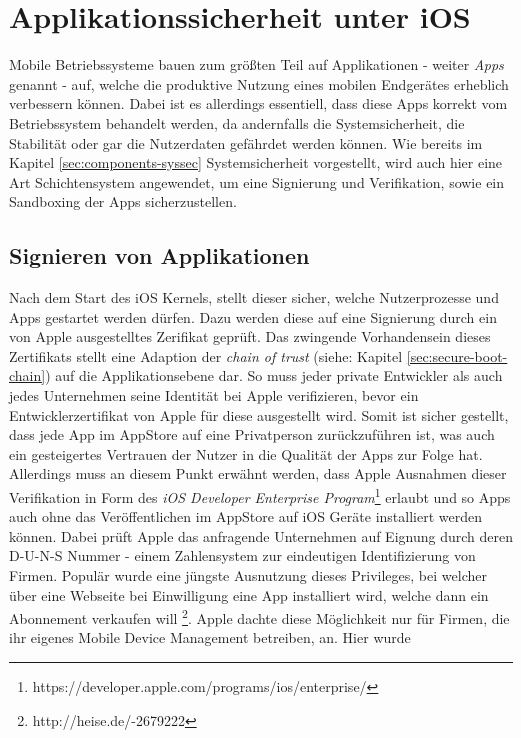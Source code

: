 \section{Applikationssicherheit unter iOS}
	Mobile Betriebssysteme bauen zum größten Teil auf Applikationen - weiter
	\textsl{Apps} genannt - auf, welche die produktive Nutzung eines mobilen
	Endgerätes erheblich verbessern können. Dabei ist es allerdings
	essentiell, dass diese Apps korrekt vom Betriebssystem behandelt werden, da
	andernfalls die Systemsicherheit, die Stabilität oder gar die Nutzerdaten
	gefährdet werden können. Wie bereits im Kapitel \ref{sec:components-syssec}
	Systemsicherheit vorgestellt, wird auch hier eine Art
	Schichtensystem angewendet, um eine Signierung und Verifikation, sowie ein
	Sandboxing der Apps sicherzustellen.
	
	\subsection{Signieren von Applikationen}
		Nach dem Start des iOS Kernels, stellt dieser sicher, welche Nutzerprozesse
		und Apps gestartet werden dürfen. Dazu werden diese auf eine Signierung durch
		ein von Apple ausgestelltes Zerifikat geprüft. Das zwingende Vorhandensein
		dieses Zertifikats stellt eine Adaption der \textsl{chain of trust} (siehe:
		Kapitel \ref{sec:secure-boot-chain}) auf die Applikationsebene dar. So muss
		jeder private Entwickler als auch jedes Unternehmen seine Identität bei Apple
		verifizieren, bevor ein Entwicklerzertifikat von Apple für diese ausgestellt
		wird. Somit ist sicher gestellt, dass jede App im AppStore auf eine
		Privatperson zurückzuführen ist, was auch ein gesteigertes Vertrauen der
		Nutzer in die Qualität der Apps zur Folge hat.\\
		Allerdings muss an diesem Punkt erwähnt werden, dass Apple Ausnahmen dieser
		Verifikation in Form des \textsl{iOS Developer Enterprise
		Program}\footnote{https://developer.apple.com/programs/ios/enterprise/}
		erlaubt und so Apps auch ohne das Veröffentlichen im AppStore auf iOS Geräte
		installiert werden können. Dabei prüft Apple das anfragende Unternehmen auf
		Eignung durch deren D-U-N-S Nummer - einem Zahlensystem zur eindeutigen
		Identifizierung von Firmen. Populär wurde eine jüngste Ausnutzung dieses
		Privileges, bei welcher über eine Webseite bei Einwilligung eine App
		installiert wird, welche dann ein Abonnement verkaufen will
		\footnote{http://heise.de/-2679222}. Apple dachte diese Möglichkeit nur für
		Firmen, die ihr eigenes Mobile Device Management betreiben, an. Hier wurde
